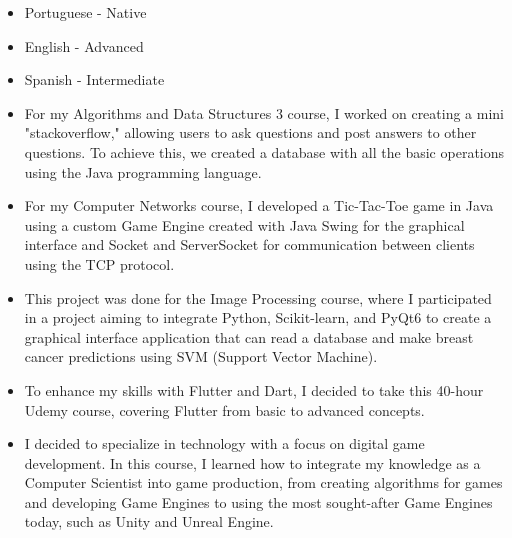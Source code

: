 \begin{itemize}
    \setlength\itemsep{1em}
    \item Portuguese - Native 
    \item English \hspace{16pt}- Advanced
    \item Spanish \hspace{1pt} - Intermediate
\end{itemize}

\begin{itemize}
\item For my Algorithms and Data Structures 3 course, I worked on creating a mini "stackoverflow," allowing users to ask questions and post answers to other questions. To achieve this, we created a database with all the basic operations using the Java programming language.
\end{itemize}
\smallskip
{}
\begin{itemize}
\item For my Computer Networks course, I developed a Tic-Tac-Toe game in Java using a custom Game Engine created with Java Swing for the graphical interface and Socket and ServerSocket for communication between clients using the TCP protocol.
\end{itemize}
\smallskip
{}
\begin{itemize}
\item This project was done for the Image Processing course, where I participated in a project aiming to integrate Python, Scikit-learn, and PyQt6 to create a graphical interface application that can read a database and make breast cancer predictions using SVM (Support Vector Machine).
\end{itemize}
\smallskip

\begin{itemize}
\item To enhance my skills with Flutter and Dart, I decided to take this 40-hour Udemy course, covering Flutter from basic to advanced concepts.
\end{itemize}
\smallskip
{}
\begin{itemize}
\item I decided to specialize in technology with a focus on digital game development. In this course, I learned how to integrate my knowledge as a Computer Scientist into game production, from creating algorithms for games and developing Game Engines to using the most sought-after Game Engines today, such as Unity and Unreal Engine.
\end{itemize}
